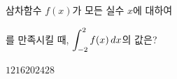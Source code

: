 삼차함수 $f(x)$가 모든 실수 $x$에 대하여 \par\smallskip{}\par\smallskip\noindent 를 만족시킬 때, $\displaystyle\int_{-2}^{2}f(x)\mkern3mu dx$의 값은?
\begin{choices32}{$12$}{$16$}{$20$}{$24$}{$28$}\end{choices32}

